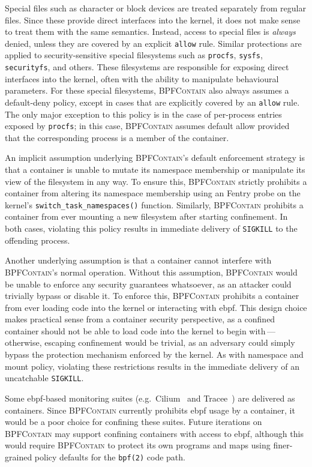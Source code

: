 \documentclass[
  fontsize=12pt,
  titlepage=firstiscover,
  paper=letter,
oneside,
  cleardoublepage=plain,
  parskip=half-,
  DIV=10,
  parindent,
  appendixprefix,
  chapterprefix,
  listof=totoc,
]{scrbook}
\newcommand{\bpfcontain}{\textsc{BPFContain}}
\begin{document}
Special files such as character or block devices are treated separately from regular
files. Since these provide direct interfaces into the kernel, it does not make sense to
treat them with the same semantics. Instead, access to special files is \textit{always}
denied, unless they are covered by an explicit \texttt{allow} rule. Similar protections
are applied to security-sensitive special filesystems such as \texttt{procfs},
\texttt{sysfs}, \texttt{securityfs}, and others. These filesystems are responsible for
exposing direct interfaces into the kernel, often with the ability to manipulate
behavioural parameters. For these special filesystems, \bpfcontain{} also always assumes
a default-deny policy, except in cases that are explicitly covered by an \texttt{allow}
rule. The only major exception to this policy is in the case of per-process entries
exposed by \texttt{procfs}; in this case, \bpfcontain{} assumes default allow provided
that the corresponding process is a member of the container.

An implicit assumption underlying \bpfcontain{}'s default enforcement strategy is that
a container is unable to mutate its namespace membership or manipulate its view of the
filesystem in any way. To ensure this, \bpfcontain{} strictly prohibits a container from
altering its namespace membership using an Fentry probe on the kernel's
\texttt{switch\_task\_namespaces()} function. Similarly, \bpfcontain{} prohibits
a container from ever mounting a new filesystem after starting confinement. In both cases,
violating this policy results in immediate delivery of \texttt{SIGKILL} to the offending
process.

Another underlying assumption is that a container cannot interfere with \bpfcontain{}'s
normal operation. Without this assumption, \bpfcontain{} would be unable to enforce any
security guarantees whatsoever, as an attacker could trivially bypass or disable it. To
enforce this, \bpfcontain{} prohibits a container from ever loading code into the kernel
or interacting with \gls{ebpf}. This design choice makes practical sense from a container
security perspective, as a confined container should not be able to load code into the
kernel to begin with\,---\,otherwise, escaping confinement would be trivial, as an
adversary could simply bypass the protection mechanism enforced by the kernel. As with
namespace and mount policy, violating these restrictions results in the immediate delivery
of an uncatchable \texttt{SIGKILL}.

Some \gls{ebpf}-based monitoring suites (e.g.~Cilium~\cite{cilium} and
Tracee~\cite{tracee}) are delivered as containers. Since \bpfcontain{} currently prohibits
\gls{ebpf} usage by a container, it would be a poor choice for confining these suites.
Future iterations on \bpfcontain{} may support confining containers with access to
\gls{ebpf}, although this would require \bpfcontain{} to protect its own programs and maps
using finer-grained policy defaults for the \texttt{bpf(2)} code path.
\end{document}
